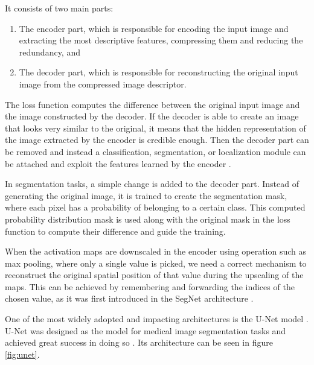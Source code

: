 It consists of two main parts:

\begin{enumerate}
    \item The encoder part, which is responsible for encoding the input image and extracting the most descriptive features, compressing them and reducing the redundancy, and
    \item The decoder part, which is responsible for reconstructing the original input image from the compressed image descriptor.
\end{enumerate}

The loss function computes the difference between the original input image and the image constructed by the decoder. If the decoder is able to create an image that looks very similar to the original, it means that the hidden representation of the image extracted by the encoder is credible enough. Then the decoder part can be removed and instead a classification, segmentation, or localization module can be attached and exploit the features learned by the encoder \cite{Santosh2022-2}.

In segmentation tasks, a simple change is added to the decoder part. Instead of generating the original image, it is trained to create the segmentation mask, where each pixel has a probability of belonging to a certain class. This computed probability distribution mask is used along with the original mask in the loss function to compute their difference and guide the training.

When the activation maps are downscaled in the encoder using operation such as max pooling, where only a single value is picked, we need a correct mechanism to reconstruct the original spatial position of that value during the upscaling of the maps. This can be achieved by remembering and forwarding the indices of the chosen value, as it was first introduced in the SegNet architecture \cite{Badrinarayanan2017}.

One of the most widely adopted and impacting architectures is the U-Net model \cite{Ronneberger2015}. U-Net was designed as the model for medical image segmentation tasks and achieved great success in doing so \cite{Santosh2022-3, Siddique2021}. Its architecture can be seen in figure \ref{fig:unet}.


